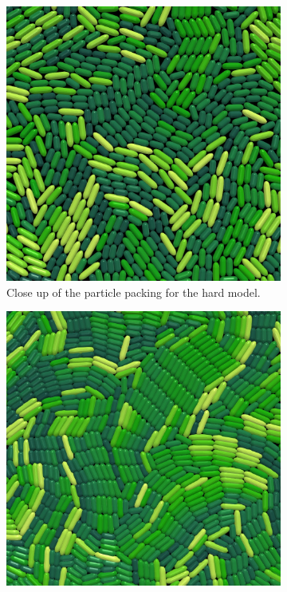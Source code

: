 \documentclass[conference]{IEEEtran}
\begin{document}
\begin{figure}
    \centering
    \begin{subfigure}[b]{0.49\columnwidth}
        \centering
        \includegraphics[width=\linewidth]{figures/comparisons/packing_hard.jpeg}
        \caption{Close up of the particle packing for the hard model.}
        \label{fig:sensor3}
    \end{subfigure}
    \begin{subfigure}[b]{0.49\columnwidth}
        \centering
        \includegraphics[width=\linewidth]{figures/comparisons/packing_soft.jpeg}

\end{subfigure}
\end{figure}
\end{document}
